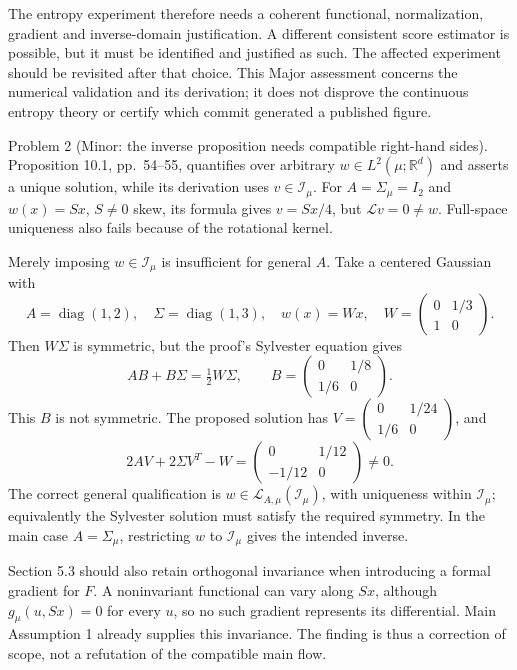 \documentclass[10pt]{article}
\begin{document}
The entropy experiment therefore needs a coherent functional, normalization, gradient and inverse-domain justification. A different consistent score estimator is possible, but it must be identified and justified as such. The affected experiment should be revisited after that choice. This Major assessment concerns the numerical validation and its derivation; it does not disprove the continuous entropy theory or certify which commit generated a published figure.\par
Problem 2 (Minor: the inverse proposition needs compatible right-hand sides).  Proposition 10.1, pp. 54–55, quantifies over arbitrary \(w\in L^2(\mu;\mathbb R^d)\) and asserts a unique solution, while its derivation uses \(v\in\mathcal I_\mu\). For \(A=\Sigma_\mu=I_2\) and \(w(x)=Sx\), \(S\ne0\) skew, its formula gives \(v=Sx/4\), but \(\mathcal L v=0\ne w\). Full-space uniqueness also fails because of the rotational kernel.\par
Merely imposing \(w\in\mathcal I_\mu\) is insufficient for general \(A\). Take a centered Gaussian with \[A=\operatorname{diag}(1,2),\quad\Sigma=\operatorname{diag}(1,3),
 \quad w(x)=Wx,\quad W=\begin{pmatrix}0&1/3\\1&0\end{pmatrix}.\] Then \(W\Sigma\) is symmetric, but the proof’s Sylvester equation gives \[AB+B\Sigma=\tfrac12W\Sigma,\qquad
 B=\begin{pmatrix}0&1/8\\1/6&0\end{pmatrix}.\] This \(B\) is not symmetric. The proposed solution has \(V=\left(\begin{smallmatrix}0&1/24\\1/6&0\end{smallmatrix}\right)\), and \[2AV+2\Sigma V^T-W
 =\begin{pmatrix}0&1/12\\-1/12&0\end{pmatrix}\ne0.\] The correct general qualification is \(w\in\mathcal L_{A,\mu}(\mathcal I_\mu)\), with uniqueness within \(\mathcal I_\mu\); equivalently the Sylvester solution must satisfy the required symmetry. In the main case \(A=\Sigma_\mu\), restricting \(w\) to \(\mathcal I_\mu\) gives the intended inverse.\par
Section 5.3 should also retain orthogonal invariance when introducing a formal gradient for \(F\). A noninvariant functional can vary along \(Sx\), although \(g_\mu(u,Sx)=0\) for every \(u\), so no such gradient represents its differential. Main Assumption 1 already supplies this invariance. The finding is thus a correction of scope, not a refutation of the compatible main flow.\par
\end{document}
